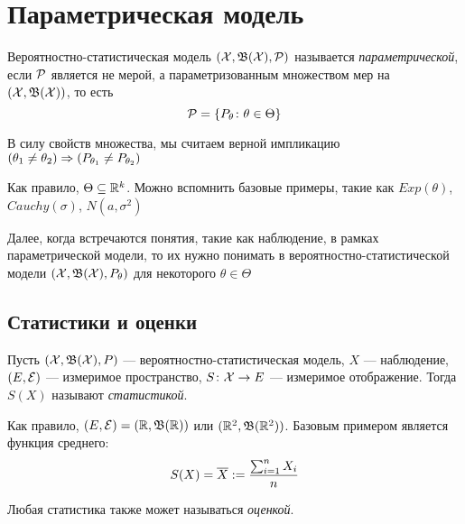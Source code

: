 \section{Параметрическая модель}

\begin{definition}
	Вероятностно-статистическая модель $(\mathcal{X}, \mathfrak{B}(\mathcal{X}), \mathcal{P})$ называется \textit{параметрической}, если $\mathcal{P}$ является не мерой, а параметризованным множеством мер на \\ $(\mathcal{X}, \mathfrak{B}(\mathcal{X}))$, то есть
	\[
		\mathcal{P} = \{P_\theta \colon \theta \in \Theta\}
	\]
\end{definition}

\begin{note}
	В силу свойств множества, мы считаем верной импликацию $(\theta_1 \neq \theta_2) \Rightarrow (P_{\theta_1} \neq P_{\theta_2})$
\end{note}

\begin{note}
	Как правило, $\Theta \subseteq \mathbb{R}^k$. Можно вспомнить базовые примеры, такие как $Exp(\theta)$, $Cauchy(\sigma)$, $N(a, \sigma^2)$
\end{note}

\begin{anote}
	Далее, когда встречаются понятия, такие как наблюдение, в рамках параметрической модели, то их нужно понимать в вероятностно-статистической модели $(\mathcal{X}, \mathfrak{B}(\mathcal{X}), P_\theta)$ для некоторого $\theta \in \Theta$
\end{anote}

\subsection{Статистики и оценки}

\begin{definition}
	Пусть $(\mathcal{X}, \mathfrak{B}(\mathcal{X}), P)$ --- вероятностно-статистическая модель, $X$ --- наблюдение, $(E, \mathcal{E})$ --- измеримое пространство, $S \colon \mathcal{X} \to E$ --- измеримое отображение. Тогда $S(X)$ называют \textit{статистикой}.
\end{definition}

\begin{note}
	Как правило, $(E, \mathcal{E}) = (\mathbb{R}, \mathfrak{B}(\mathbb{R}))$ или $(\mathbb{R}^2, \mathfrak{B}(\mathbb{R}^2))$. Базовым примером является функция среднего:
	\[
		S(X) = \overline{X} := \frac{\sum_{i = 1}^n X_i}{n}
	\]
\end{note}

\begin{definition}
	Любая статистика также может называться \textit{оценкой}.
\end{definition}

